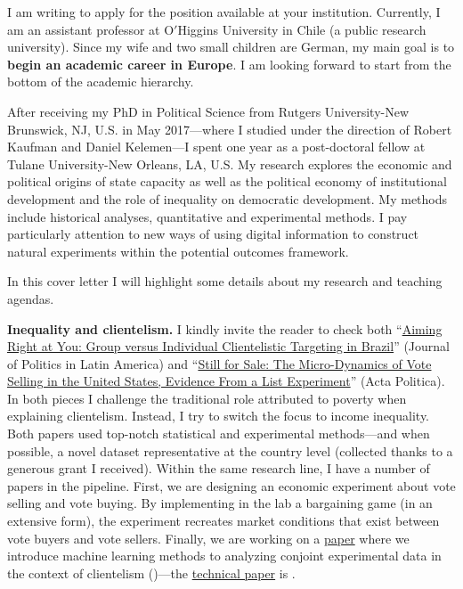 \vspace{-0.3cm}I am writing to apply for the position available at your institution. Currently, I am an assistant professor at O$'$Higgins University in Chile (a public research university). Since my wife and two small children are German, my main goal is to {\bf begin an academic career in Europe}. I am looking forward to start from the bottom of the academic hierarchy. 

After receiving my PhD in Political Science from Rutgers University-New Brunswick, NJ, U.S. in May 2017---where I studied under the direction of Robert Kaufman and Daniel Kelemen---I spent one year as a post-doctoral fellow at Tulane University-New Orleans, LA, U.S. My research explores the economic and political origins of state capacity as well as the political economy of institutional development and the role of inequality on democratic development. My methods include historical analyses, quantitative and experimental methods. I pay particularly attention to new ways of using digital information to construct natural experiments within the potential outcomes framework. 

In this cover letter I will highlight some details about my research and teaching agendas.

{\bf Inequality and clientelism.} I kindly invite the reader to check both ``\href{https://journals.sub.uni-hamburg.de/giga/jpla/article/view/1121/1128}{Aiming Right at You: Group versus Individual Clientelistic Targeting in Brazil}'' (Journal of Politics in Latin America) and ``\href{https://doi.org/10.1057/s41269-020-00174-4}{Still for Sale: The Micro-Dynamics of Vote Selling in the United States, Evidence From a List Experiment}'' (Acta Politica). In both pieces I challenge the traditional role attributed to poverty when explaining clientelism. Instead, I try to switch the focus to income inequality. Both papers used top-notch statistical and experimental methods---and when possible, a novel dataset representative at the country level (collected thanks to a generous grant I received). Within the same research line, I have a number of papers in the pipeline. First, we are designing an economic experiment about vote selling and vote buying. By implementing in the lab a bargaining game (in an extensive form), the experiment recreates market conditions that exist between vote buyers and vote sellers. Finally, we are working on a \href{https://github.com/hbahamonde/Conjoint_US/raw/master/Bahamonde_Quininao_Conjoint.pdf}{paper} where we introduce machine learning methods to analyzing conjoint experimental data in the context of clientelism ({\unskip})---the \href{https://github.com/hbahamonde/Conjoint_US/raw/master/Bahamonde_Quininao_Conjoint_Letter_PA.pdf}{technical paper} is {\unskip}.



